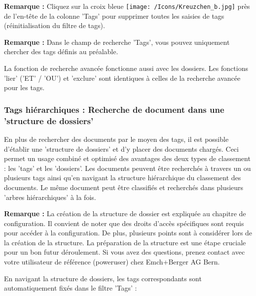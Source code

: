 \vspace{\baselineskip}

\textbf{Remarque :} Cliquez sur la croix bleue \texttt{[image: /Icons/Kreuzchen\_b.jpg]} près de l'en-tête de la colonne 'Tags' pour supprimer toutes les saisies de tags (réinitialisation du filtre de tags).

\vspace{\baselineskip}

\textbf{Remarque :} Dans le champ de recherche 'Tags', vous pouvez uniquement chercher des tags définis au préalable.

\vspace{\baselineskip}

La fonction de recherche avancée fonctionne aussi avec les dossiers. Les fonctions 'lier' ('ET' / 'OU') et 'exclure' sont identiques à celles de la recherche avancée pour les tags.

\subsubsection{Tags hiérarchiques : Recherche de document dans une 'structure de dossiers'}
\label{bkm:Ref201801849}

En plus de rechercher des documents par le moyen des tags, il est possible d'établir une 'structure de dossiers' et d'y placer des documents chargés. Ceci permet un usage combiné et optimisé des avantages des deux types de classement : les 'tags' et les 'dossiers'. Les documents peuvent être recherchés à travers un ou plusieurs tags ainsi qu'en navigant la structure hiérarchique du classement des documents. Le même document peut être classifiés et recherchés dans plusieurs 'arbres hiérarchiques' à la fois.

\vspace{\baselineskip}

\textbf{Remarque :} La création de la structure de dossier est expliquée au chapitre de configuration. Il convient de noter que des droits d'accès spécifiques sont requis pour accéder à la configuration. De plus, plusieurs points sont à considérer lors de la création de la structure. La préparation de la structure est une étape cruciale pour un bon futur déroulement. Si vous avez des questions, prenez contact avec votre utilisateur de référence (poweruser) chez Emch+Berger AG Bern.

\vspace{\baselineskip}

En navigant la structure de dossiers, les tags correspondants sont automatiquement fixés dans le filtre 'Tags' :

